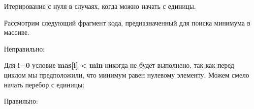 \begin{typerror}
	\label{TE_for-from-0-instead-of-1}
	Итерирование с нуля в случаях, когда можно начать с единицы.

	Рассмотрим следующий фрагмент кода, предназначенный для поиска минимума в массиве.

	Неправильно:

	Для \textbf{i=0} условие \textbf{mas[i] < min} никогда не будет выполнено,
	так как перед циклом мы предположили, что минимум равен нулевому элементу.
	Можем смело начать перебор с единицы:

	Правильно:

\end{typerror}
